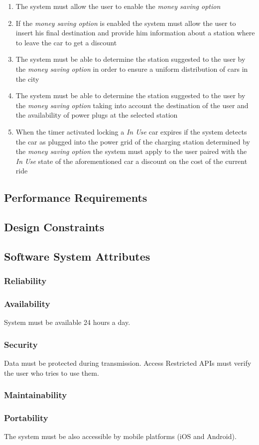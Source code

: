 \begin{description}
  			\begin{enumerate}[resume*]
  				\item The system must allow the user to enable the \emph{money saving option}
  				\item If the  \emph{money saving option} is enabled the system must allow the user
  				to insert his final destination and provide him information about a station where to
  				leave the car to get a discount
  				\item The system must be able to determine the station suggested to the user by the
  				\emph{money saving option} in order to ensure a uniform distribution of cars in the
  				city
  				\item The system must be able to determine the station suggested to the user by the
  				\emph{money saving option} taking into account the destination of the user and
  				the availability of power plugs at the selected station
  				\item When the timer activated locking a \emph{In Use} car expires if the system
  				detects the car as plugged into the power grid of the charging station determined by
  				the \emph{money saving option} the system must apply to the user paired with the
  				\emph{In Use} state of the aforementioned car a discount on the cost of
  				the current ride		
   			\end{enumerate}
  	\end{description}
  	
\subsection{Performance Requirements}
\subsection{Design Constraints}
\subsection{Software System Attributes}
	\subsubsection{Reliability}
	\subsubsection{Availability}
	System must be available 24 hours a day.
	\subsubsection{Security}
	Data must be protected during transmission.
	Access Restricted APIs must verify the user who tries to use them.
	\subsubsection{Maintainability}
	\subsubsection{Portability}
	The system must be also accessible by mobile platforms (iOS and Android).

